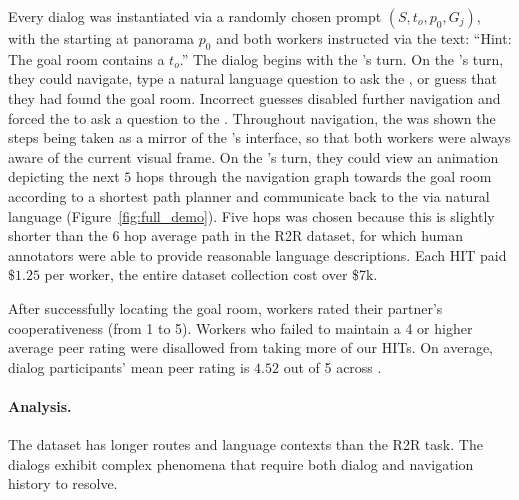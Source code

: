 Every dialog was instantiated via a randomly chosen prompt $(S, t_o, p_0, G_j)$, with the \nav{} starting at panorama $p_0$ and both workers instructed via the text: ``Hint: The goal room contains a $t_o$.''
The dialog begins with the \nav{}'s turn.
On the \nav{}'s turn, they could navigate, type a natural language question to ask the \ora{}, or guess that they had found the goal room.
Incorrect guesses disabled further navigation and forced the \nav{} to ask a question to the \ora{}.
Throughout navigation, the \ora{} was shown the steps being taken as a mirror of the \nav{}'s interface, so that both workers were always aware of the current visual frame.
On the \ora{}'s turn, they could view an animation depicting the next $5$ hops through the navigation graph towards the goal room according to a shortest path planner and communicate back to the \nav{} via natural language (Figure~\ref{fig:full_demo}).
Five hops was chosen because this is slightly shorter than the $6$ hop average path in the R2R dataset, for which human annotators were able to provide reasonable language descriptions.
Each HIT paid $\$1.25$ per worker, the entire dataset collection cost over \$7k.

After successfully locating the goal room, workers rated their partner's cooperativeness (from 1 to 5).
Workers who failed to maintain a 4 or higher average peer rating were disallowed from taking more of our HITs.
On average, dialog participants' mean peer rating is $4.52$ out of 5 across \dataset{}.

\paragraph{Analysis.}
The \dataset{} dataset has longer routes and language contexts than the R2R task.
The dialogs exhibit complex phenomena that require both dialog and navigation history to resolve.

